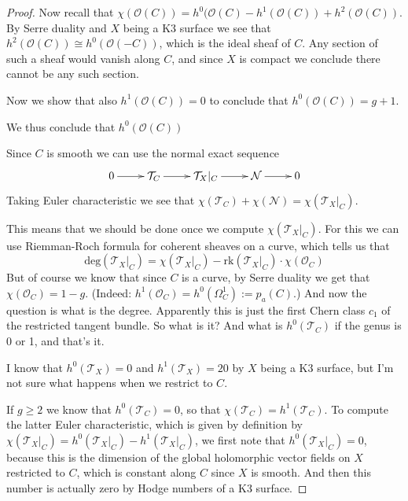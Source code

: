 \begin{proof}
Now recall that $\chi(\mathcal{O}(C))=h^0(\mathcal{O}(C)
-h^1(\mathcal{O}(C))+h^2(\mathcal{O}(C))$. By Serre duality and $X$ being a K3
surface we see that $h^2(\mathcal{O}(C))\cong h^{0}(\mathcal{O}(-C))$, which is
the ideal sheaf of $C$. Any section of such a sheaf would vanish along $C$, and
since $X$ is compact we conclude there cannot be any such section.

Now we show that also $h^1(\mathcal{O}(C))=0$ to conclude that
$h^0(\mathcal{O}(C))=g+1$. 

We thus conclude that $h^0(\mathcal{O}(C))$




Since $C$ is smooth we can use the normal exact sequence
$$
\xymatrix{
0\ar[r]&\mathcal{T}_C\ar[r]&\mathcal{T}_X|_{C}\ar[r]&\mathcal{N}\ar[r]&0
}
$$
Taking Euler characteristic we see that
$\chi(\mathcal{T}_C)+\chi(\mathcal{N})=\chi(\mathcal{T}_X|_{C})$.


This means that we should be done once we compute $\chi(\mathcal{T}_X|_{C})$. 
For this we can use Riemman-Roch formula for coherent sheaves on a curve, which
tells us that
$$
\text{deg}(\mathcal{T}_X|_{C})=\chi(\mathcal{T}_X|_{C})
-\text{rk}(\mathcal{T}_X|_{C})\cdot\chi(\mathcal{O}_C)
$$
But of course we know that since $C$ is a curve, by Serre duality we get that
$\chi(\mathcal{O}_C)=1-g$. (Indeed:
$h^1(\mathcal{O}_C)=h^0(\Omega^1_C):=p_a(C)$.) And now the question is what is
the degree. Apparently this is just the first Chern class $c_1$ of the
restricted tangent bundle. So what is it? And what is $h^0(\mathcal{T}_C)$ if
the genus is 0 or 1, and that's it.

I
know that $h^0(\mathcal{T}_X)=0$ and $h^1(\mathcal{T}_X)=20$ by $X$ being a K3
surface, but I'm not sure what happens when we restrict to $C$.

If $g \geq 2$ we know that $h^0(\mathcal{T}_C)=0$, so that
$\boxed{\chi(\mathcal{T}_C)=h^1(\mathcal{T}_C)}$.
\bigskip
To compute the
latter Euler characteristic, which is given by definition by
$\chi(\mathcal{T}_X|_{C})=h^0(\mathcal{T}_X|_{C})-h^1(\mathcal{T}_X|_{C})$, we
first note that $h^0(\mathcal{T}_X|_{C})=0$, because this is the dimension of
the global holomorphic vector fields on $X$
restricted to $C$, which is constant along $C$ since $X$ is
smooth. And then this number is actually zero by Hodge numbers of a K3 surface.


\end{proof}
